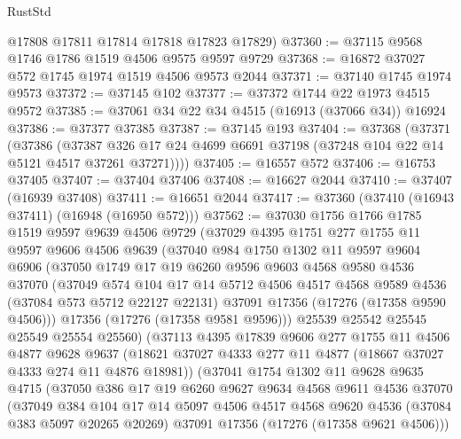 \begin{lexlean}{RustStd}
\begin{coremodule}
      @17808
      @17811
      @17814
      @17818
      @17823
      @17829)
@37360 := @37115 @9568 @1746 @1786 @1519 @4506 @9575 @9597 @9729
@37368 := @16872 @37027 @572 @1745 @1974 @1519 @4506 @9573 @2044
@37371 := @37140 @1745 @1974 @9573
@37372 := @37145 @102
@37377 := @37372 @1744 @22 @1973 @4515 @9572
@37385 := @37061 @34 @22 @34 @4515 (@16913 (@37066 @34)) @16924
@37386 := @37377 @37385
@37387 := @37145 @193
@37404 := @37368
    (@37371
      (@37386
        (@37387 @326 @17 @24 @4699 @6691 @37198 (@37248 @104 @22 @14 @5121 @4517 @37261 @37271))))
@37405 := @16557 @572
@37406 := @16753 @37405
@37407 := @37404 @37406
@37408 := @16627 @2044
@37410 := @37407 (@16939 @37408)
@37411 := @16651 @2044
@37417 := @37360 (@37410 (@16943 @37411) (@16948 (@16950 @572)))
@37562 := @37030
    @1756
    @1766
    @1785
    @1519
    @9597
    @9639
    @4506
    @9729
    (@37029
      @4395
      @1751
      @277
      @1755
      @11
      @9597
      @9606
      @4506
      @9639
      (@37040
        @984
        @1750
        @1302
        @11
        @9597
        @9604
        @6906
        (@37050
          @1749
          @17
          @19
          @6260
          @9596
          @9603
          @4568
          @9580
          @4536
          @37070
          (@37049
            @574
            @104
            @17
            @14
            @5712
            @4506
            @4517
            @4568
            @9589
            @4536
            (@37084 @573 @5712 @22127 @22131)
            @37091
            @17356
            (@17276 (@17358 @9590 @4506)))
          @17356
          (@17276 (@17358 @9581 @9596)))
        @25539
        @25542
        @25545
        @25549
        @25554
        @25560)
      (@37113
        @4395
        @17839
        @9606
        @277
        @1755
        @11
        @4506
        @4877
        @9628
        @9637
        (@18621 @37027 @4333 @277 @11 @4877 (@18667 @37027 @4333 @274 @11 @4876 @18981))
        (@37041
          @1754
          @1302
          @11
          @9628
          @9635
          @4715
          (@37050
            @386
            @17
            @19
            @6260
            @9627
            @9634
            @4568
            @9611
            @4536
            @37070
            (@37049
              @384
              @104
              @17
              @14
              @5097
              @4506
              @4517
              @4568
              @9620
              @4536
              (@37084 @383 @5097 @20265 @20269)
              @37091
              @17356
              (@17276 (@17358 @9621 @4506)))

\end{coremodule}
\end{lexlean}
